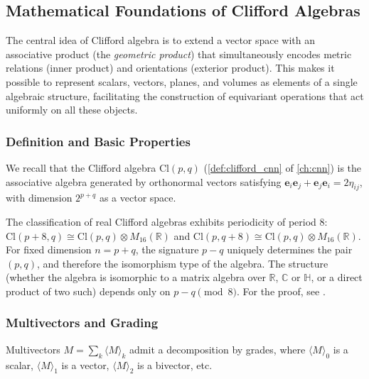 \subsection{Mathematical Foundations of Clifford Algebras}

The central idea of Clifford algebra is to extend a vector space with an associative product (the \textit{geometric product}) that simultaneously encodes metric relations (inner product) and orientations (exterior product). This makes it possible to represent scalars, vectors, planes, and volumes as elements of a single algebraic structure, facilitating the construction of equivariant operations that act uniformly on all these objects.

\subsubsection{Definition and Basic Properties}

We recall that the Clifford algebra $\text{Cl}(p,q)$ (\autoref{def:clifford_cnn} of \autoref{ch:cnn}) is the associative algebra generated by orthonormal vectors satisfying $\mathbf{e}_i \mathbf{e}_j + \mathbf{e}_j \mathbf{e}_i = 2\eta_{ij}$, with dimension $2^{p+q}$ as a vector space.\label{def:algebra_clifford}

\begin{theorem}\label{thm:clasificacion_clifford}
The classification of real Clifford algebras exhibits periodicity of period 8: $\text{Cl}(p+8, q) \cong \text{Cl}(p, q) \otimes M_{16}(\mathbb{R})$ and $\text{Cl}(p, q+8) \cong \text{Cl}(p, q) \otimes M_{16}(\mathbb{R})$. For fixed dimension $n = p + q$, the signature $p - q$ uniquely determines the pair $(p,q)$, and therefore the isomorphism type of the algebra. The structure (whether the algebra is isomorphic to a matrix algebra over $\mathbb{R}$, $\mathbb{C}$ or $\mathbb{H}$, or a direct product of two such) depends only on $p - q \pmod{8}$. For the proof, see \citep{lawson1989spin}.
\end{theorem}

\subsubsection{Multivectors and Grading}

Multivectors $M = \sum_k \langle M \rangle_k$ admit a decomposition by grades, where $\langle M \rangle_0$ is a scalar, $\langle M \rangle_1$ is a vector, $\langle M \rangle_2$ is a bivector, etc.\label{def:multivector}

